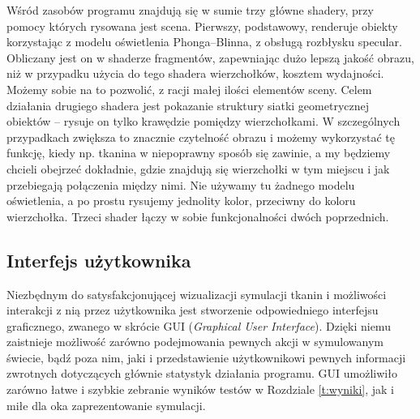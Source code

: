 		Wśród zasobów programu znajdują się w sumie trzy główne shadery, przy pomocy których rysowana jest scena. Pierwszy, podstawowy, renderuje obiekty korzystając z modelu oświetlenia Phonga--Blinna, z obsługą rozbłysku specular. Obliczany jest on w shaderze fragmentów, zapewniając dużo lepszą jakość obrazu, niż w przypadku użycia do tego shadera wierzchołków, kosztem wydajności. Możemy sobie na to pozwolić, z racji małej ilości elementów sceny. Celem działania drugiego shadera jest pokazanie struktury siatki geometrycznej obiektów -- rysuje on tylko krawędzie pomiędzy wierzchołkami. W szczególnych przypadkach zwiększa to znacznie czytelność obrazu i możemy wykorzystać tę funkcję, kiedy np. tkanina w niepoprawny sposób się zawinie, a my będziemy chcieli obejrzeć dokładnie, gdzie znajdują się wierzchołki w tym miejscu i jak przebiegają połączenia między nimi. Nie używamy tu żadnego modelu oświetlenia, a po prostu rysujemy jednolity kolor, przeciwny do koloru wierzchołka. Trzeci shader łączy w sobie funkcjonalności dwóch poprzednich.
		
		\subsection{Interfejs użytkownika}
		\label{t:praktyka:silnik:gui}
		
		
		Niezbędnym do satysfakcjonującej wizualizacji symulacji tkanin i możliwości interakcji z nią przez użytkownika jest stworzenie odpowiedniego interfejsu graficznego, zwanego w skrócie GUI (\emph{Graphical User Interface}). Dzięki niemu zaistnieje możliwość zarówno podejmowania pewnych akcji w symulowanym świecie, bądź poza nim, jaki i przedstawienie użytkownikowi pewnych informacji zwrotnych dotyczących głównie statystyk działania programu. GUI umożliwiło zarówno łatwe i szybkie zebranie wyników testów w Rozdziale \ref{t:wyniki}, jak i miłe dla oka zaprezentowanie symulacji.
		
